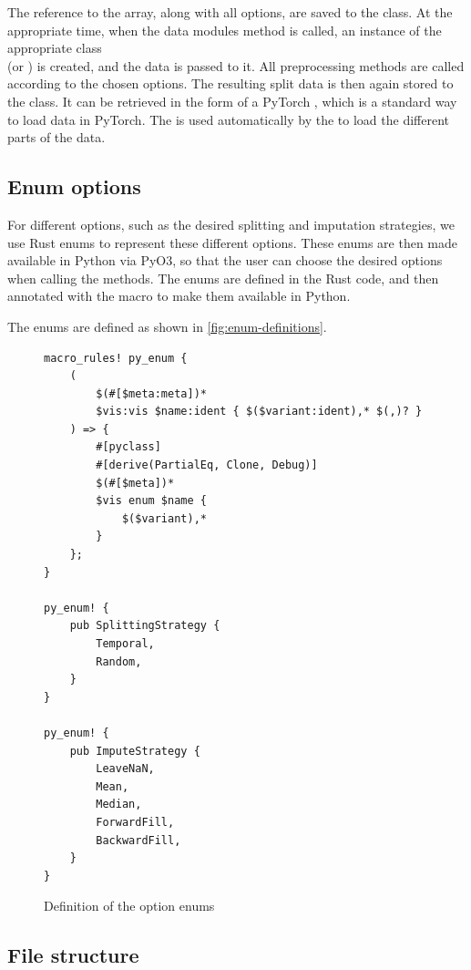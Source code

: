 \documentclass[review]{AIM_report}
\begin{document}
The reference to the \numpy array, along with all options, are saved to the class. At the appropriate time, when the data modules \setup method is called, an instance of the appropriate class\\
(\forecastingDataSet or \classificationDataSet) is created, and the data is passed to it. All preprocessing methods are called according to the chosen options. The resulting split data is then again stored to the \rustDM class. It can be retrieved in the form of a PyTorch \dataLoader, which is a standard way to load data in PyTorch. The \dataLoader is used automatically by the \lightningModule to load the different parts of the data.

\subsection{Enum options}

For different options, such as the desired splitting and imputation strategies, we use Rust enums to represent these different options. These enums are then made available in Python via PyO3, so that the user can choose the desired options when calling the methods. The enums are defined in the Rust code, and then annotated with the \pyclass macro to make them available in Python.

The enums are defined as shown in \autoref{fig:enum-definitions}.

\begin{figure}[H]
    \begin{lstlisting}[style=rust]
macro_rules! py_enum {
    (
        $(#[$meta:meta])*
        $vis:vis $name:ident { $($variant:ident),* $(,)? }
    ) => {
        #[pyclass]
        #[derive(PartialEq, Clone, Debug)]
        $(#[$meta])*
        $vis enum $name {
            $($variant),*
        }
    };
}

py_enum! {
    pub SplittingStrategy {
        Temporal,
        Random,
    }
}

py_enum! {
    pub ImputeStrategy {
        LeaveNaN,
        Mean,
        Median,
        ForwardFill,
        BackwardFill,
    }
}
\end{lstlisting}
    \caption{Definition of the option enums}
    \label{fig:enum-definitions}
\end{figure}

\subsection{File structure}
\end{document}

